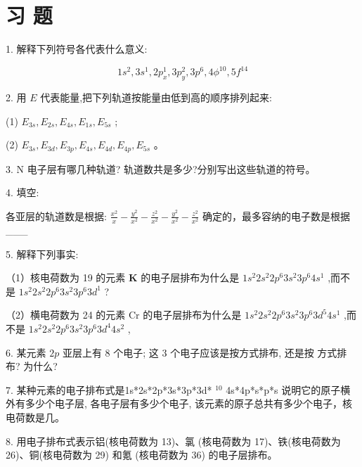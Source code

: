\documentclass[10pt]{article}
\begin{document}
\section*{习 题}

1. 解释下列符号各代表什么意义:

\[
1{s}^{2},3{s}^{1},2{p}_{x}^{1},3{p}_{y}^{2},3{p}^{6},4{\phi }^{10},5{f}^{14}
\]

2. 用 \(E\) 代表能量,把下列轨道按能量由低到高的顺序排列起来:

(1) \({E}_{3s},{E}_{2s},{E}_{4s},{E}_{1s},{E}_{5s}\) ;

(2) \({E}_{3s},{E}_{3d},{E}_{3p},{E}_{4s},{E}_{4d},{E}_{4p},{E}_{5s}\) 。

3. N 电子层有哪几种轨道? 轨道数共是多少?分别写出这些轨道的符号。

4. 填空:

\begin{center}
\end{center}

各亚层的轨道数是根据: \(\frac{{x}^{2}}{x} - \frac{{y}^{2}}{{x}^{2}} - \frac{{z}^{2}}{{x}^{2}} - \frac{{y}^{2}}{{x}^{2}} - \frac{{z}^{2}}{{x}^{2}}\) 确定的，最多容纳的电子数是根据\_\_\_

5. 解释下列事实:

（1）核电荷数为 19 的元素 \(\mathbf{K}\) 的电子层排布为什么是 \(1{s}^{2}2{s}^{2}2{p}^{6}3{s}^{2}3{p}^{6}4{s}^{1}\) ,而不是 \(1{s}^{2}2{s}^{2}2{p}^{6}3{s}^{2}3{p}^{6}3{d}^{1}\) ?

（2）横电荷数为 24 的元素 \(\mathrm{{Cr}}\) 的电子层排布为什么是 \(1{s}^{2}2{s}^{2}2{p}^{6}3{s}^{2}3{p}^{6}3{d}^{5}4{s}^{1}\) ,而不是 \(1{s}^{2}2{s}^{2}2{p}^{6}3{s}^{2}3{p}^{6}3{d}^{4}4{s}^{2}\) ,

6. 某元素 \({2p}\) 亚层上有 8 个电子; 这 3 个电子应该是按方式排布, 还是按 方式排布? 为什么?

7. 某种元素的电子排布式是1s*2s*2p*3s*3p*3d* \({}^{10}\) 4s*4p*s*p*s 说明它的原子横外有多少个电子层, 各电子层有多少个电子, 该元素的原子总共有多少个电子，核电荷数是几。

8. 用电子排布式表示铝(核电荷数为 13)、氯 (核电荷数为 17)、铁(核电荷数为 26)、铜(核电荷数为 29) 和氪 (核电荷数为 36) 的电子层排布。
\end{document}
